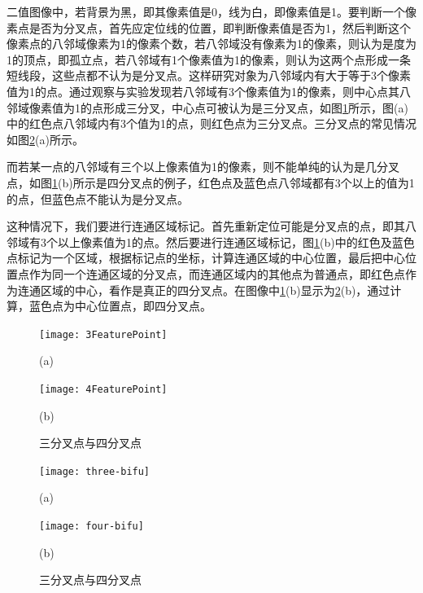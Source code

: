 二值图像中，若背景为黑，即其像素值是0，线为白，即像素值是1。要判断一个像素点是否为分叉点，首先应定位线的位置，即判断像素值是否为1，然后判断这个像素点的八邻域像素为1的像素个数，若八邻域没有像素为1的像素，则认为是度为1的顶点，即孤立点，若八邻域有1个像素值为1的像素，则认为这两个点形成一条短线段，这些点都不认为是分叉点。这样研究对象为八邻域内有大于等于3个像素值为1的点。通过观察与实验发现若八邻域有3个像素值为1的像素，则中心点其八邻域像素值为1的点形成三分叉，中心点可被认为是三分叉点，如图\ref{fig:FeaturePoints}所示，图(a)中的红色点八邻域内有3个值为1的点，则红色点为三分叉点。三分叉点的常见情况如图\ref{fig:FeaturePoints-image}(a)所示。

而若某一点的八邻域有三个以上像素值为1的像素，则不能单纯的认为是几分叉点，如图\ref{fig:FeaturePoints}(b)所示是四分叉点的例子，红色点及蓝色点八邻域都有3个以上的值为1的点，但蓝色点不能认为是分叉点。

这种情况下，我们要进行连通区域标记。首先重新定位可能是分叉点的点，即其八邻域有3个以上像素值为1的点。然后要进行连通区域标记，图\ref{fig:FeaturePoints}(b)中的红色及蓝色点标记为一个区域，根据标记点的坐标，计算连通区域的中心位置，最后把中心位置点作为同一个连通区域的分叉点，而连通区域内的其他点为普通点，即红色点作为连通区域的中心，看作是真正的四分叉点。在图像中\ref{fig:FeaturePoints}(b)显示为\ref{fig:FeaturePoints-image}(b)，通过计算，蓝色点为中心位置点，即四分叉点。

\begin{figure}
\centering
  \begin{minipage}[b]{0.48\textwidth} 
      \centering 
      \texttt{[image: 3FeaturePoint]}
        \centerline{(a)}\medskip
	 \label{fig:3FeaturePoint}
    \end{minipage}
  \begin{minipage}[b]{0.48\textwidth}
    \centering
    \texttt{[image: 4FeaturePoint]}
      \centerline{(b)}\medskip
	\label{fig:4FeaturePoint}
  \end{minipage}
\caption{三分叉点与四分叉点}
\label{fig:FeaturePoints}
\end{figure}

\begin{figure}
\centering
  \begin{minipage}[b]{1\textwidth} 
      \centering 
      \texttt{[image: three-bifu]}
        \centerline{(a)}\medskip
    \end{minipage}
  \begin{minipage}[b]{1\textwidth}
    \centering
    \texttt{[image: four-bifu]}
      \centerline{(b)}\medskip
  \end{minipage}
\caption{三分叉点与四分叉点}
\label{fig:FeaturePoints-image}
\end{figure}

